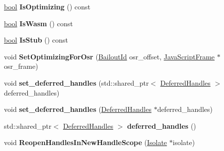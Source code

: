 \begin{DoxyCompactItemize}
\mbox{\hyperlink{classbool}{bool}} {\bfseries Is\+Optimizing} () const
\item 
\mbox{\label{classv8_1_1internal_1_1OptimizedCompilationInfo_a21fecfffa0466dabd03d835bf219f238}} 
\mbox{\hyperlink{classbool}{bool}} {\bfseries Is\+Wasm} () const
\item 
\mbox{\label{classv8_1_1internal_1_1OptimizedCompilationInfo_a250c5355b458ee58d6182e5619d02a50}} 
\mbox{\hyperlink{classbool}{bool}} {\bfseries Is\+Stub} () const
\item 
\mbox{\label{classv8_1_1internal_1_1OptimizedCompilationInfo_a43ab769c79ff5e11e9b404c116b5efbe}} 
void {\bfseries Set\+Optimizing\+For\+Osr} (\mbox{\hyperlink{classv8_1_1internal_1_1BailoutId}{Bailout\+Id}} osr\+\_\+offset, \mbox{\hyperlink{classv8_1_1internal_1_1JavaScriptFrame}{Java\+Script\+Frame}} $\ast$osr\+\_\+frame)
\item 
\mbox{\label{classv8_1_1internal_1_1OptimizedCompilationInfo_a7e09f64f168dfbba7ea9e8bd516475d0}} 
void {\bfseries set\+\_\+deferred\+\_\+handles} (std\+::shared\+\_\+ptr$<$ \mbox{\hyperlink{classv8_1_1internal_1_1DeferredHandles}{Deferred\+Handles}} $>$ deferred\+\_\+handles)
\item 
\mbox{\label{classv8_1_1internal_1_1OptimizedCompilationInfo_a8fb052515b44033bb8c056338e81fd82}} 
void {\bfseries set\+\_\+deferred\+\_\+handles} (\mbox{\hyperlink{classv8_1_1internal_1_1DeferredHandles}{Deferred\+Handles}} $\ast$deferred\+\_\+handles)
\item 
\mbox{\label{classv8_1_1internal_1_1OptimizedCompilationInfo_ae3b753791647e59009e21262973cc856}} 
std\+::shared\+\_\+ptr$<$ \mbox{\hyperlink{classv8_1_1internal_1_1DeferredHandles}{Deferred\+Handles}} $>$ {\bfseries deferred\+\_\+handles} ()
\item 
\mbox{\label{classv8_1_1internal_1_1OptimizedCompilationInfo_a03681ab0b5724e1a8926ff8e3fbbb7b0}} 
void {\bfseries Reopen\+Handles\+In\+New\+Handle\+Scope} (\mbox{\hyperlink{classv8_1_1internal_1_1Isolate}{Isolate}} $\ast$isolate)

\end{DoxyCompactItemize}
